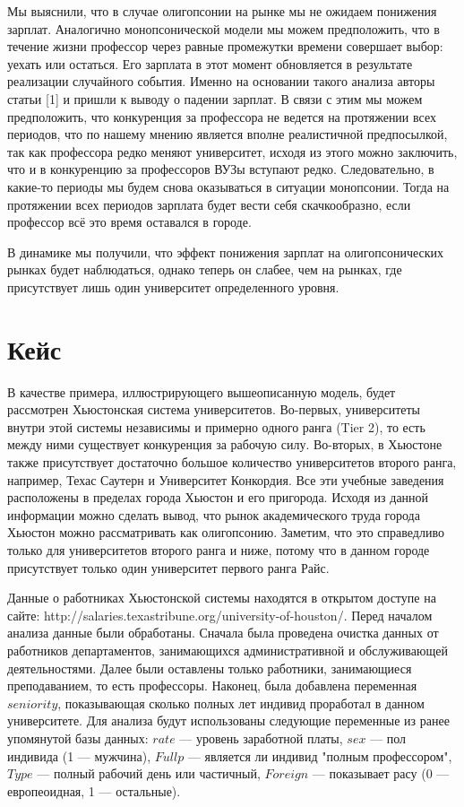 \documentclass[a4paper, 12pt]{article}
\theoremstyle{definition}
\theoremstyle{plain}
\begin{document}
Мы выяснили, что в случае олигопсонии на рынке мы не ожидаем понижения зарплат. Аналогично монопсонической модели мы можем предположить, что в течение жизни профессор через равные промежутки времени совершает выбор: уехать или остаться.  Его зарплата в этот момент обновляется в результате реализации случайного события.  Именно на основании такого анализа авторы статьи [1] и пришли к выводу о падении зарплат. В связи с этим мы можем предположить, что конкуренция за профессора не ведется на протяжении всех периодов, что по нашему мнению является вполне реалистичной предпосылкой, так как профессора редко меняют университет, исходя из этого можно заключить, что и в конкуренцию за профессоров ВУЗы вступают редко. Следовательно, в какие-то периоды мы будем снова оказываться в ситуации монопсонии. Тогда на протяжении всех периодов зарплата будет вести себя скачкообразно, если профессор всё это время оставался в городе. %

В динамике мы получили, что эффект понижения зарплат на олигопсонических рынках будет наблюдаться, однако теперь он слабее, чем на рынках, где присутствует лишь один университет определенного уровня.

\section{Кейс}

В качестве примера, иллюстрирующего вышеописанную модель, будет рассмотрен Хьюстонская система университетов. Во-первых, университеты внутри этой системы независимы и примерно одного ранга (Tier 2), то есть между ними существует конкуренция за рабочую силу. Во-вторых, в Хьюстоне также присутствует достаточно большое количество университетов второго ранга, например, Техас Саутерн и Университет Конкордия. Все эти учебные заведения расположены в пределах города Хьюстон и его пригорода. Исходя из данной информации можно сделать вывод, что рынок академического труда города Хьюстон можно рассматривать как олигопсонию. Заметим, что это справедливо только для университетов второго ранга и ниже, потому что в данном городе присутствует только один университет первого ранга Райс.

Данные о работниках Хьюстонской системы находятся в открытом доступе на сайте: http://salaries.texastribune.org/university-of-houston/. Перед началом анализа данные были обработаны. Сначала была проведена очистка данных от работников департаментов, занимающихся административной и обслуживающей деятельностями. Далее были оставлены только работники, занимающиеся преподаванием, то есть профессоры. Наконец, была добавлена переменная $seniority$, показывающая сколько полных лет индивид проработал в данном университете.
Для анализа будут использованы следующие переменные из ранее упомянутой базы данных: $rate$ --- уровень заработной платы, $sex$ --- пол индивида (1 --- мужчина), $Fullp$ --- является ли индивид "полным профессором", $Type$ --- полный рабочий день или частичный, $Foreign$ --- показывает расу (0 --- европеоидная, 1 --- остальные).
\end{document}
